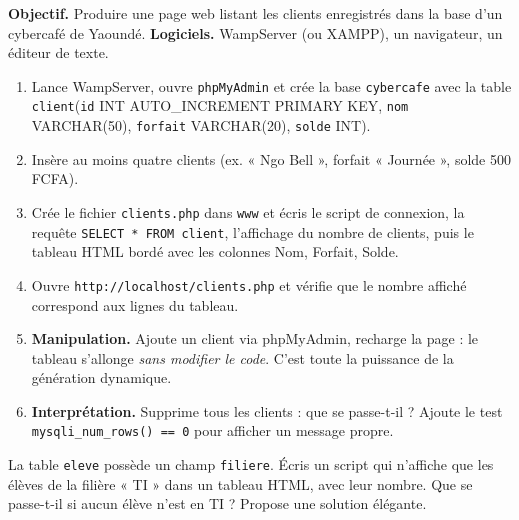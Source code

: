 \documentclass[11pt]{article}
\begin{document}
\begin{experience}
\textbf{Objectif.} Produire une page web listant les clients enregistrés dans la base d'un cybercafé de Yaoundé.
\textbf{Logiciels.} WampServer (ou XAMPP), un navigateur, un éditeur de texte.
\begin{enumerate}
\item Lance WampServer, ouvre \texttt{phpMyAdmin} et crée la base \texttt{cybercafe} avec la table \texttt{client}(\texttt{id} INT AUTO\_INCREMENT PRIMARY KEY, \texttt{nom} VARCHAR(50), \texttt{forfait} VARCHAR(20), \texttt{solde} INT).
\item Insère au moins quatre clients (ex. « Ngo Bell », forfait « Journée », solde 500 FCFA).
\item Crée le fichier \texttt{clients.php} dans \texttt{www} et écris le script de connexion, la requête \texttt{SELECT * FROM client}, l'affichage du nombre de clients, puis le tableau HTML bordé avec les colonnes Nom, Forfait, Solde.
\item Ouvre \texttt{http://localhost/clients.php} et vérifie que le nombre affiché correspond aux lignes du tableau.
\item \textbf{Manipulation.} Ajoute un client via phpMyAdmin, recharge la page : le tableau s'allonge \emph{sans modifier le code}. C'est toute la puissance de la génération dynamique.
\item \textbf{Interprétation.} Supprime tous les clients : que se passe-t-il ? Ajoute le test \texttt{mysqli\_num\_rows() == 0} pour afficher un message propre.
\end{enumerate}
\end{experience}

\begin{exercice}
La table \texttt{eleve} possède un champ \texttt{filiere}. Écris un script qui n'affiche que les élèves de la filière « TI » dans un tableau HTML, avec leur nombre. Que se passe-t-il si aucun élève n'est en TI ? Propose une solution élégante.
\end{exercice}
\end{document}
